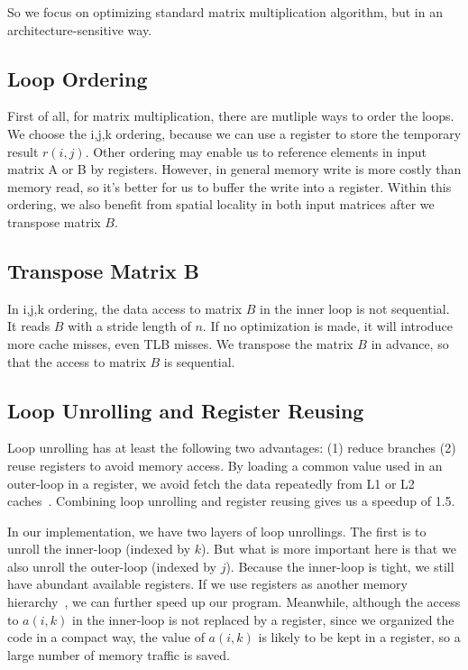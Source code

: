 \documentclass[twocolumn,letterpaper,10pt]{article}
\begin{document}
So we focus on optimizing standard matrix
multiplication algorithm, but in an architecture-sensitive way.

\subsection{Loop Ordering}
First of all, for matrix multiplication, there are mutliple ways to order the
loops. We choose the i,j,k ordering, because
we can use a register to store the temporary result
$r(i,j)$. Other ordering may enable us to reference elements in input
matrix A or B by registers. However, in general memory write is more
costly than memory read, so it's better for us to buffer the
write into a register. Within this ordering, we also benefit from
spatial locality in both input matrices after we transpose matrix $B$.

\subsection{Transpose Matrix B}
In i,j,k ordering, the data access to matrix $B$
in the inner loop is not sequential. It reads $B$ with a stride length
of $n$. If no optimization is made, it will
introduce more cache misses, even TLB misses. We transpose the matrix $B$ in advance, so that the access to matrix $B$ is sequential.

\subsection{Loop Unrolling and Register Reusing}
Loop unrolling has at least the following
two advantages: (1) reduce branches (2) reuse registers to avoid memory
access. By loading a common value used in an outer-loop in a register,
we avoid fetch the data repeatedly from L1 or L2 caches~\cite{revisited,berkeley}. Combining
loop unrolling and register reusing gives us a speedup of 1.5.

In our implementation, we have two layers of loop unrollings. The first
is to unroll the inner-loop (indexed by $k$). But what is more
important here is that  we also unroll the outer-loop (indexed by $j$). Because
the inner-loop is tight, we still have abundant available
registers. If we use registers as another memory hierarchy~\cite{revisited},
we can further speed up our program. Meanwhile, although the access to
$a(i,k)$ in the inner-loop is not replaced by a register, since we
organized the code in a compact way, the value of $a(i,k)$ is likely
to be kept in a register, so a large number of memory traffic is
saved.
\end{document}
